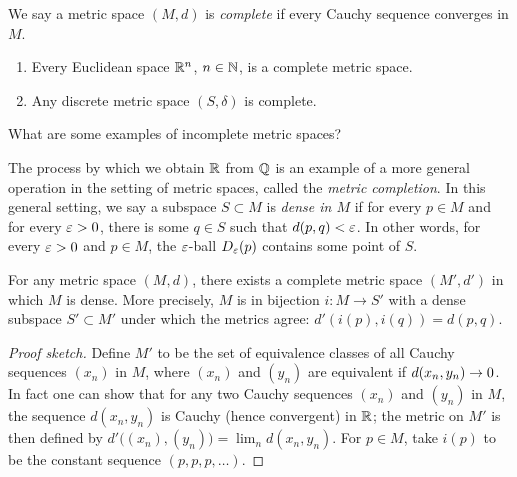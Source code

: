 \documentclass{book}
\begin{document}
\begin{defn}
We say a metric space $(M,d)$ is {\em complete} if every Cauchy sequence converges in $M$.
\label{D:metric_cauchy}
\end{defn}

\begin{thmstar}
\mbox{}
\begin{enumerate}
\item Every Euclidean space $\mathbb{R}^n$, $n \in \mathbb{N}$, is a complete metric space.
\item Any discrete metric space $(S,\delta)$ is complete.
\end{enumerate}
\label{T:complete}
\end{thmstar}

\begin{ex}
What are some examples of incomplete metric spaces?
\label{X:incomplete}
\end{ex}

The process by which we obtain $\mathbb{R}$ from $\mathbb{Q}$ is an example of a more
general operation in the setting of metric spaces, called the {\em metric
completion}. In this general setting, we say a subspace $S \subset M$ is {\em
dense in $M$} if for every $p \in M$ and for every $\varepsilon > 0$, there is some $q
\in S$ such that $d(p,q) < \varepsilon$. In other words, for every $\varepsilon > 0$ and $p \in
M$, the $\varepsilon$-ball $D_\varepsilon(p)$ contains some point of $S$.

\begin{thmdag}
For any metric space $(M,d)$, there exists a complete metric space $(M',d')$ in which $M$ is dense. More precisely, $M$
is in bijection $i : M \to S'$ with a dense subspace $S' \subset M'$ under which the metrics agree: $d'(i(p),i(q)) = d(p,q)$. 
\label{T:metric_completion}
\end{thmdag}
\begin{proof}[Proof sketch]
Define $M'$ to be the set of equivalence classes of all Cauchy sequences $(x_n)$ in $M$, where $(x_n)$ and $(y_n)$ are equivalent
if $d(x_n,y_n) \rightarrow 0$. In fact one can show that for any two Cauchy sequences $(x_n)$ and $(y_n)$ in $M$, the sequence $d(x_n,y_n)$ is Cauchy (hence
convergent) in $\mathbb{R}$; the metric on $M'$ is then defined by $d'\big((x_n),(y_n)\big) = \lim_n d(x_n,y_n)$. For $p \in M$, take $i(p)$ to be the constant
sequence $(p, p, p, \ldots)$. 
\end{proof}
\end{document}
